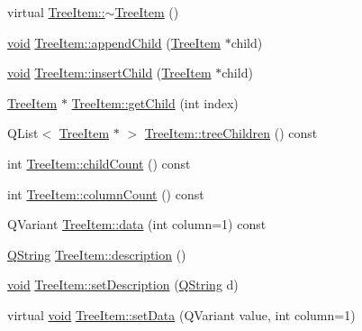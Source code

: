 \begin{DoxyCompactItemize}
\item 
virtual \hyperlink{group___u_a_v_object_browser_plugin_ga859429185d908c3e54861bbbfb185425}{\-Tree\-Item\-::$\sim$\-Tree\-Item} ()
\item 
\hyperlink{group___u_a_v_objects_plugin_ga444cf2ff3f0ecbe028adce838d373f5c}{void} \hyperlink{group___u_a_v_object_browser_plugin_gac7f432ac0587ca037e80857eefd622f8}{\-Tree\-Item\-::append\-Child} (\hyperlink{class_tree_item}{\-Tree\-Item} $\ast$child)
\item 
\hyperlink{group___u_a_v_objects_plugin_ga444cf2ff3f0ecbe028adce838d373f5c}{void} \hyperlink{group___u_a_v_object_browser_plugin_ga1d0b952f15a93167dadb41667ccc5e4c}{\-Tree\-Item\-::insert\-Child} (\hyperlink{class_tree_item}{\-Tree\-Item} $\ast$child)
\item 
\hyperlink{class_tree_item}{\-Tree\-Item} $\ast$ \hyperlink{group___u_a_v_object_browser_plugin_gae115cb3e046c94117d64ee87764cb3ef}{\-Tree\-Item\-::get\-Child} (int index)
\item 
\-Q\-List$<$ \hyperlink{class_tree_item}{\-Tree\-Item} $\ast$ $>$ \hyperlink{group___u_a_v_object_browser_plugin_gaa56dc80d617c2c9bd914abe5da774fd8}{\-Tree\-Item\-::tree\-Children} () const 
\item 
int \hyperlink{group___u_a_v_object_browser_plugin_ga55ffe6dd27750e479034b93e753f87af}{\-Tree\-Item\-::child\-Count} () const 
\item 
int \hyperlink{group___u_a_v_object_browser_plugin_ga31c3fb89ad8e19ae696a310a1f843a8e}{\-Tree\-Item\-::column\-Count} () const 
\item 
\-Q\-Variant \hyperlink{group___u_a_v_object_browser_plugin_ga7c5708ae3cbba9c509f497c493beccb6}{\-Tree\-Item\-::data} (int column=1) const 
\item 
\hyperlink{group___u_a_v_objects_plugin_gab9d252f49c333c94a72f97ce3105a32d}{\-Q\-String} \hyperlink{group___u_a_v_object_browser_plugin_gadb051f76eb10bd51ba2b7830601f0046}{\-Tree\-Item\-::description} ()
\item 
\hyperlink{group___u_a_v_objects_plugin_ga444cf2ff3f0ecbe028adce838d373f5c}{void} \hyperlink{group___u_a_v_object_browser_plugin_ga14cc339bd1ed2fc44cb352461c623031}{\-Tree\-Item\-::set\-Description} (\hyperlink{group___u_a_v_objects_plugin_gab9d252f49c333c94a72f97ce3105a32d}{\-Q\-String} d)
\item 
virtual \hyperlink{group___u_a_v_objects_plugin_ga444cf2ff3f0ecbe028adce838d373f5c}{void} \hyperlink{group___u_a_v_object_browser_plugin_gac71bc85379e761548f4a7d15f049cdd8}{\-Tree\-Item\-::set\-Data} (\-Q\-Variant value, int column=1)

\end{DoxyCompactItemize}
